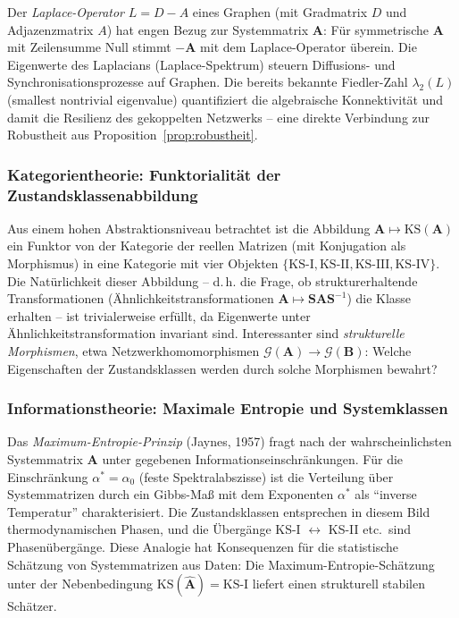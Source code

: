 ﻿\documentclass[12pt, a4paper, titlepage]{report}
\theoremstyle{definition}
\theoremstyle{remark}
\newcommand{\vA}{\bm{A}}
\newcommand{\vB}{\bm{B}}
\newcommand{\vS}{\bm{S}}
\newcommand{\KS}{\mathrm{KS}}
\begin{document}
Der \emph{Laplace-Operator} $L = D - A$ eines Graphen (mit Gradmatrix $D$ und
Adjazenzmatrix $A$) hat engen Bezug zur Systemmatrix $\vA$: Für symmetrische $\vA$
mit Zeilensumme Null stimmt $-\vA$ mit dem Laplace-Operator überein. Die Eigenwerte
des Laplacians (Laplace-Spektrum) steuern Diffusions- und Synchronisationsprozesse
auf Graphen. Die bereits bekannte Fiedler-Zahl $\lambda_2(L)$ (smallest nontrivial
eigenvalue) quantifiziert die algebraische Konnektivität und damit die
Resilienz des gekoppelten Netzwerks -- eine direkte Verbindung zur Robustheit
aus Proposition~\ref{prop:robustheit}.

\subsubsection*{Kategorientheorie: Funktorialität der Zustandsklassenabbildung}

Aus einem hohen Abstraktionsniveau betrachtet ist die Abbildung
$\vA \mapsto \KS(\vA)$ ein Funktor von der Kategorie der reellen Matrizen
(mit Konjugation als Morphismus) in eine Kategorie mit vier Objekten
$\{\KS\text{-I}, \KS\text{-II}, \KS\text{-III}, \KS\text{-IV}\}$.
Die Natürlichkeit dieser Abbildung -- d.\,h. die Frage, ob strukturerhaltende
Transformationen (Ähnlichkeitstransformationen $\vA \mapsto \vS\vA\vS^{-1}$)
die Klasse erhalten -- ist trivialerweise erfüllt, da Eigenwerte unter
Ähnlichkeitstransformation invariant sind. Interessanter sind \emph{strukturelle
Morphismen}, etwa Netzwerkhomomorphismen $\mathcal{G}(\vA) \to \mathcal{G}(\vB)$:
Welche Eigenschaften der Zustandsklassen werden durch solche Morphismen bewahrt?

\subsubsection*{Informationstheorie: Maximale Entropie und Systemklassen}

Das \emph{Maximum-Entropie-Prinzip} (Jaynes, 1957) fragt nach der
wahrscheinlichsten Systemmatrix $\vA$ unter gegebenen Informationseinschränkungen.
Für die Einschränkung $\alpha^* = \alpha_0$ (feste Spektralabszisse) ist die
Verteilung über Systemmatrizen durch ein Gibbs-Maß mit dem Exponenten $\alpha^*$
als ``inverse Temperatur'' charakterisiert. Die Zustandsklassen entsprechen in
diesem Bild thermodynamischen Phasen, und die Übergänge KS-I $\leftrightarrow$ KS-II
etc.\ sind Phasenübergänge. Diese Analogie hat Konsequenzen für die statistische
Schätzung von Systemmatrizen aus Daten: Die Maximum-Entropie-Schätzung unter der
Nebenbedingung $\KS(\hat{\vA}) = \KS\text{-I}$ liefert einen strukturell stabilen
Schätzer.
\end{document}
